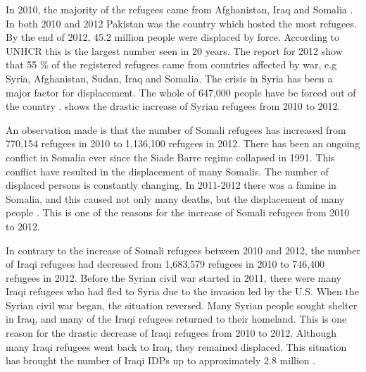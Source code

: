 In 2010, the majority of the refugees came from Afghanistan, Iraq and Somalia \cite{UNHCRstat2010}. In both 2010 and 2012 Pakistan was the country which hosted the most refugees. By the end of 2012, 45.2 million people were displaced by force. According to UNHCR this is the largest number seen in 20 years. The report for 2012 show that 55 \% of the registered refugees came from countries affected by war, e.g Syria, Afghanistan, Sudan, Iraq and Somalia. The crisis in Syria has been a major factor for displacement. The whole of 647,000 people have be forced out of the country \cite{UNHCRstat2012}.  shows the drastic increase of Syrian refugees from 2010 to 2012. 

An observation made is that the number of Somali refugees has increased from 770,154 refugees in 2010 to 1,136,100 refugees in 2012. There has been an ongoing conflict in Somalia ever since the Siade Barre regime collapsed in 1991. This conflict have resulted in the displacement of many Somalis. The number of displaced persons is constantly changing. In 2011-2012 there was a famine in Somalia, and this caused not only many deaths, but the displacement of many people \cite{somalia}. This is one of the reasons for the increase of Somali refugees from 2010 to 2012. 

In contrary to the increase of Somali refugees between 2010 and 2012, the number of Iraqi refugees had decreased from 1,683,579 refugees in 2010 to 746,400 refugees in 2012. Before the Syrian civil war started in 2011, there were many Iraqi refugees who had fled to Syria due to the invasion led by the U.S. When the Syrian civil war began, the situation reversed. Many Syrian people sought shelter in Iraq, and many of the Iraqi refugees returned to their homeland. This is one reason for the drastic decrease of Iraqi refugees from 2010 to 2012. Although many Iraqi refugees went back to Iraq, they remained displaced. This situation has brought the number of Iraqi IDPs up to approximately 2.8 million \citep{iraq}. 

